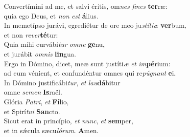 \evenverse Convertímini ad me, et salvi éritis, om\textit{nes} \textit{fi}\textit{nes} \textbf{ter}ræ:~\*\\
\evenverse quia ego Deus, et \textit{non} \textit{est} \textbf{á}lius.\\
\oddverse In memetípso jurávi, egrediétur de ore meo ju\textit{stí}\textit{ti}\textit{æ} \textbf{ver}bum,~\*\\
\oddverse et non \textit{re}\textit{ver}\textbf{té}tur:\\
\evenverse Quia mihi curvábi\textit{tur} \textit{om}\textit{ne} \textbf{ge}nu,~\*\\
\evenverse et jurábit \textit{om}\textit{nis} \textbf{lin}gua.\\
\oddverse Ergo in Dómino, dicet, meæ sunt justíti\textit{æ} \textit{et} \textit{im}\textbf{pé}rium:~\*\\
\oddverse ad eum vénient, et confundéntur omnes qui re\textit{pú}\textit{gnant} \textbf{e}i.\\
\evenverse In Dómino justificábi\textit{tur}, \textit{et} \textit{lau}\textbf{dá}bitur~\*\\
\evenverse omne \textit{se}\textit{men} \textbf{Is}raël.\\
\oddverse Glória \textit{Pa}\textit{tri}, \textit{et} \textbf{Fí}lio,~\*\\
\oddverse et Spirí\textit{tu}\textit{i} \textbf{San}cto.\\
\evenverse Sicut erat in princípio, \textit{et} \textit{nunc}, \textit{et} \textbf{sem}per,~\*\\
\evenverse et in sǽcula sæcu\textit{ló}\textit{rum}. \textbf{A}men.\\
